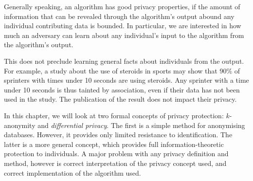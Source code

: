 {  Generally speaking, an algorithm has good privacy properties, if the
  amount of information that can be revealed through the algorithm's
  output abound any individual contributing data is bounded. In
  particular, we are interested in how much an adversary can learn
  about any individual's input to the algorithm from the algorithm's
  output.

  This does not preclude learning general facts about individuals from
  the output. For example, a study about the use of steroids in sports
  may show that 90\% of sprinters with times under 10 seconds are
  using steroids. Any sprinter with a time under 10 seconds is thus
  tainted by association, even if their data has not been used in the
  study. The publication of the result does not impact their privacy.
    
  In this chapter, we will look at two formal concepts of privacy
  protection: $k$-anonymity and \emph{differential privacy}. The first
  is a simple method for anonymising databases. However, it provides
  only limited resistance to identification. The latter is a more
  general concept, which provides full information-theoretic
  protection to individuals. A major problem with any privacy
  definition and method, however is correct interpretation of the
  privacy concept used, and correct implementation of the algorithm
  used.  }

